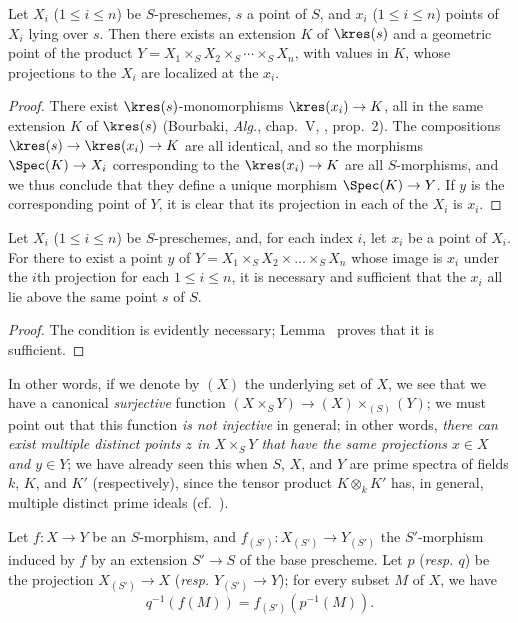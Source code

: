 \begin{lemma}[3.4.6]
\label{I.3.4.6}
Let $X_i$ ($1\leq i\leq n$) be $S$-preschemes, $s$ a point of $S$, and $x_i$
($1\leq i\leq n$) points of $X_i$ lying over $s$. Then there exists an extension
$K$ of $\kres(s)$ and a geometric point of the product
$Y=X_1\times_S X_2\times_S\cdots\times_S X_n$, with values in $K$, whose projections to
the $X_i$ are localized at the $x_i$.
\end{lemma}

\begin{proof}
There exist $\kres(s)$-monomorphisms $\kres(x_i)\to K$, all in the same extension $K$ of $\kres(s)$ (Bourbaki, \emph{Alg.}, chap.~V, , prop.~2).
The compositions $\kres(s)\to\kres(x_i)\to K$ are all identical, and so the morphisms $\Spec(K)\to X_i$ corresponding to the $\kres(x_i)\to K$ are all $S$-morphisms, and we thus conclude that they define a unique morphism $\Spec(K)\to Y$.
If $y$ is the corresponding point of $Y$, it is clear that its projection in each of the $X_i$ is $x_i$.
\end{proof}

\begin{proposition}[3.4.7]
\label{I.3.4.7}
Let $X_i$ ($1\leq i\leq n$) be $S$-preschemes, and, for each index $i$, let $x_i$ be a point of $X_i$.
For there to exist a point $y$ of $Y=X_1\times_S X_2\times\ldots\times_S X_n$ whose image is $x_i$ under the $i$th projection for each $1\leq i\leq n$, it is necessary and sufficient that the $x_i$ all lie above the same point $s$ of $S$.
\end{proposition}

\begin{proof}
The condition is evidently necessary; Lemma~ proves that it is sufficient.
\end{proof}

In other words, if we denote by $(X)$ the underlying set of $X$, we see that we have a canonical \emph{surjective} function $(X\times_S Y)\to(X)\times_{(S)}(Y)$; we must point out that this function \emph{is not injective} in general; in other words, \emph{there can exist multiple distinct points $z$ in $X\times_S Y$ that have the same projections $x\in X$ and $y\in Y$}; we have already seen this when $S$, $X$, and $Y$ are prime spectra of fields $k$, $K$, and $K'$ (respectively), since the tensor product $K\otimes_k K'$ has, in general, multiple distinct prime ideals (cf.~).

\begin{corollary}[3.4.8]
\label{I.3.4.8}
Let $f:X\to Y$ be an $S$-morphism, and $f_{(S')}:X_{(S')}\to Y_{(S')}$ the $S'$-morphism induced by $f$ by an extension $S'\to S$ of the base prescheme.
Let $p$ (\emph{resp. $q$}) be the projection $X_{(S')}\to X$ (\emph{resp. $Y_{(S')}\to Y$}); for every subset $M$ of $X$, we have
\[
  q^{-1}(f(M))=f_{(S')}(p^{-1}(M)).
\]
\end{corollary}

